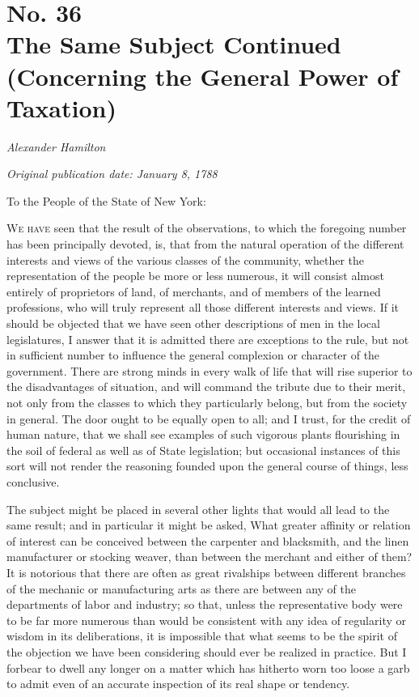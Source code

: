 \chapter[No. 36: The Same Subject Continued (Concerning the General Power of Taxation)]{No. 36\\ {\small The Same Subject Continued (Concerning the General Power of Taxation)}}

\textit{Alexander Hamilton}

\textit{Original publication date: January 8, 1788}
\vspace{1cm}

To the People of the State of New York:
\vspace{.4cm}

\textsc{We have} seen that the result of the observations, to which the foregoing number has been principally devoted, is, that from the natural operation of the different interests and views of the various classes of the community, whether the representation of the people be more or less numerous, it will consist almost entirely of proprietors of land, of merchants, and of members of the learned professions, who will truly represent all those different interests and views. 
If it should be objected that we have seen other descriptions of men in the local legislatures, I answer that it is admitted there are exceptions to the rule, but not in sufficient number to influence the general complexion or character of the government. 
There are strong minds in every walk of life that will rise superior to the disadvantages of situation, and will command the tribute due to their merit, not only from the classes to which they particularly belong, but from the society in general. 
The door ought to be equally open to all; and I trust, for the credit of human nature, that we shall see examples of such vigorous plants flourishing in the soil of federal as well as of State legislation; but occasional instances of this sort will not render the reasoning founded upon the general course of things, less conclusive.

The subject might be placed in several other lights that would all lead to the same result; and in particular it might be asked, What greater affinity or relation of interest can be conceived between the carpenter and blacksmith, and the linen manufacturer or stocking weaver, than between the merchant and either of them? 
It is notorious that there are often as great rivalships between different branches of the mechanic or manufacturing arts as there are between any of the departments of labor and industry; so that, unless the representative body were to be far more numerous than would be consistent with any idea of regularity or wisdom in its deliberations, it is impossible that what seems to be the spirit of the objection we have been considering should ever be realized in practice. 
But I forbear to dwell any longer on a matter which has hitherto worn too loose a garb to admit even of an accurate inspection of its real shape or tendency.

